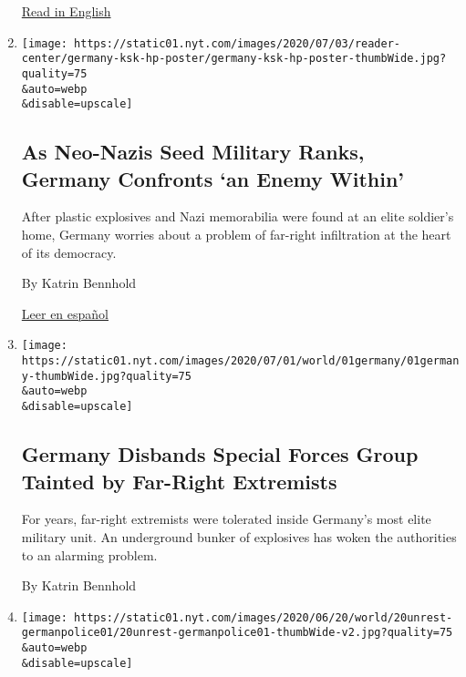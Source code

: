 \begin{enumerate}
  \href{https://www.nytimes.com/2020/07/03/world/europe/germany-military-neo-nazis-ksk.html}{Read
  in English}
\item
  \href{/2020/07/03/world/europe/germany-military-neo-nazis-ksk.html}{}

  \texttt{[image: https://static01.nyt.com/images/2020/07/03/reader-center/germany-ksk-hp-poster/germany-ksk-hp-poster-thumbWide.jpg?quality=75\\\&auto=webp\\\&disable=upscale]}

  \hypertarget{as-neo-nazis-seed-military-ranks-germany-confronts-an-enemy-within}{%
  \subsection{As Neo-Nazis Seed Military Ranks, Germany Confronts `an
  Enemy
  Within'}\label{as-neo-nazis-seed-military-ranks-germany-confronts-an-enemy-within}}

  After plastic explosives and Nazi memorabilia were found at an elite
  soldier's home, Germany worries about a problem of far-right
  infiltration at the heart of its democracy.

  By Katrin Bennhold

  \href{https://www.nytimes.com/es/2020/07/10/espanol/mundo/alemania-ksk-neonazi.html}{Leer
  en español}
\item
  \href{/2020/07/01/world/europe/german-special-forces-far-right.html}{}

  \texttt{[image: https://static01.nyt.com/images/2020/07/01/world/01germany/01germany-thumbWide.jpg?quality=75\\\&auto=webp\\\&disable=upscale]}

  \hypertarget{germany-disbands-special-forces-group-tainted-by-far-right-extremists}{%
  \subsection{Germany Disbands Special Forces Group Tainted by Far-Right
  Extremists}\label{germany-disbands-special-forces-group-tainted-by-far-right-extremists}}

  For years, far-right extremists were tolerated inside Germany's most
  elite military unit. An underground bunker of explosives has woken the
  authorities to an alarming problem.

  By Katrin Bennhold
\item
  \href{/2020/06/23/world/europe/germany-police.html}{}

  \texttt{[image: https://static01.nyt.com/images/2020/06/20/world/20unrest-germanpolice01/20unrest-germanpolice01-thumbWide-v2.jpg?quality=75\\\&auto=webp\\\&disable=upscale]}


\end{enumerate}
